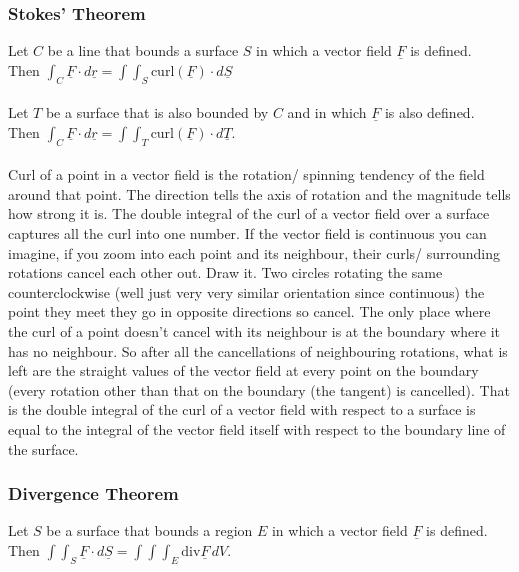 \documentclass{article}
\begin{document}
			\subsubsection{Stokes' Theorem}
				Let $C$ be a line that bounds a surface $S$ in which a vector field $\underline{F}$ is defined. \\
				Then $\int_{C}{\underline{F} \cdot d\underline{r}} = \int\int_{S}{\text{curl}(\underline{F}) \cdot d\underline{S}}$ \\
				\\
				Let $T$ be a surface that is also bounded by $C$ and in which $\underline{F}$ is also defined. \\
				Then $\int_{C}{\underline{F} \cdot d\underline{r}} = \int\int_{T}{\text{curl}(\underline{F}) \cdot d\underline{T}}$. \\
				\\
				Curl of a point in a vector field is the rotation/ spinning tendency of the field around that point. The direction tells the axis of rotation and the magnitude tells how strong it is. The double integral of the curl of a vector field over a surface captures all the curl into one number. If the vector field is continuous you can imagine, if you zoom into each point and its neighbour, their curls/ surrounding rotations cancel each other out. Draw it. Two circles rotating the same counterclockwise (well just very very similar orientation since continuous) the point they meet they go in opposite directions so cancel. The only place where the curl of a point doesn't cancel with its neighbour is at the boundary where it has no neighbour. So after all the cancellations of neighbouring rotations, what is left are the straight values of the vector field at every point on the boundary (every rotation other than that on the boundary (the tangent) is cancelled). That is the double integral of the curl of a vector field with respect to a surface is equal to the integral of the vector field itself with respect to the boundary line of the surface. \\
	
			\subsubsection{Divergence Theorem}
				Let $S$ be a surface that bounds a region $E$ in which a vector field $\underline{F}$ is defined.\\
				Then $\int\int_{S}{\underline{F} \cdot d\underline{S}} = \int\int\int_{E}{\text{div}\underline{F}}\,dV$. \\
	
\end{document}
